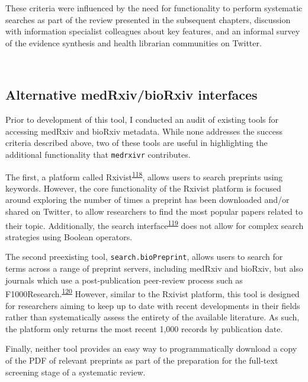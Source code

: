 \documentclass[a4paper, twoside]{templates/ociamthesis}
\begin{document}
These criteria were influenced by the need for functionality to perform systematic searches as part of the review presented in the subsequent chapters, discussion with information specialist colleagues about key features, and an informal survey of the evidence synthesis and health librarian communities on Twitter.

~

\hypertarget{alternative-medrxivbiorxiv-interfaces}{%
\subsection{Alternative medRxiv/bioRxiv interfaces}\label{alternative-medrxivbiorxiv-interfaces}}

Prior to development of this tool, I conducted an audit of existing tools for accessing medRxiv and bioRxiv metadata. While none addresses the success criteria described above, two of these tools are useful in highlighting the additional functionality that \texttt{medrxivr} contributes.

The first, a platform called Rxivist\textsuperscript{\protect\hyperlink{ref-abdill2019}{118}}, allows users to search preprints using keywords. However, the core functionality of the Rxivist platform is focused around exploring the number of times a preprint has been downloaded and/or shared on Twitter, to allow researchers to find the most popular papers related to their topic. Additionally, the search interface\textsuperscript{\protect\hyperlink{ref-zotero-15027}{119}} does not allow for complex search strategies using Boolean operators.

The second preexisting tool, \texttt{search.bioPreprint}, allows users to search for terms across a range of preprint servers, including medRxiv and bioRxiv, but also journals which use a post-publication peer-review process such as F1000Research.\textsuperscript{\protect\hyperlink{ref-iwema2016}{120}} However, similar to the Rxivist platform, this tool is designed for researchers aiming to keep up to date with recent developments in their fields rather than systematically assess the entirety of the available literature. As such, the platform only returns the most recent 1,000 records by publication date.

Finally, neither tool provides an easy way to programmatically download a copy of the PDF of relevant preprints as part of the preparation for the full-text screening stage of a systematic review.

~
\end{document}
